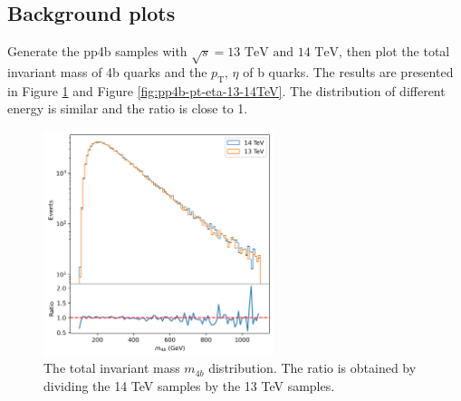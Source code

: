 \documentclass[12pt]{article}
\begin{document}
	\subsection{Background plots}%
	\label{sub:background_plots}
	Generate the pp4b samples with $\sqrt{s} = \text{13 TeV and 14 TeV}$, then plot the total invariant mass of 4b quarks and the $p_{\text{T}}$, $\eta$ of b quarks. The results are presented in Figure \ref{fig:pp4b-m4b-13-14TeV} and Figure \ref{fig:pp4b-pt-eta-13-14TeV}. The distribution of different energy is similar and the ratio is close to 1.
		\begin{figure}[htpb]
			\centering
			\includegraphics[width=0.6\textwidth]{pp4b-m4b-13-14TeV.png}
			\caption{The total invariant mass $m_{4b}$ distribution. The ratio is obtained by dividing the 14 TeV samples by the 13 TeV samples.}
			\label{fig:pp4b-m4b-13-14TeV}
		\end{figure}
\end{document}
